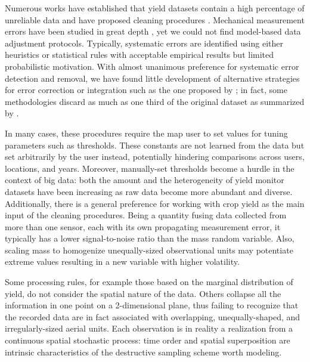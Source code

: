 Numerous works have established that yield datasets contain a high
percentage of unreliable data and have proposed cleaning procedures
\citep{Blackmore1996, Moore1998, Blackmore1999, Thylen2000, Noack2003,
  Simbahan2004, Ping2005, Sudduth2007, Sudduth2012, Spekken2013,
  Leroux2018, Leroux2019, Vega2019}. Mechanical measurement errors
have been studied in great depth \citep{Arslan1999, Arslan2002,
  Grisso2002, Burks2004, Hemming2005, Fulton2009, Schuster2017}, yet
we could not find model-based data adjustment protocols. Typically,
systematic errors are identified using either heuristics or
statistical rules with acceptable empirical results but limited
probabilistic motivation. With almost unanimous preference for
systematic error detection and removal, we have found little
development of alternative strategies for error correction or
integration such as the one proposed by \cite{Bachmaier2007,
  Bachmaier2010}; in fact, some methodologies discard as much as one
third of the original dataset as summarized by \cite{Lyle2013}.

In many cases, these procedures require the map user to set values for
tuning parameters such as thresholds. These constants are not learned
from the data but set arbitrarily by the user instead, potentially
hindering comparisons across users, locations, and years. Moreover,
manually-set thresholds become a hurdle in the context of big data:
both the amount and the heterogeneity of yield monitor datasets have
been increasing as raw data become more abundant and
diverse. Additionally, there is a general preference for working with
crop yield as the main input of the cleaning procedures. Being a
quantity fusing data collected from more than one sensor, each with
its own propagating measurement error, it typically has a lower
signal-to-noise ratio than the mass random variable. Also, scaling
mass to homogenize unequally-sized observational units may potentiate
extreme values resulting in a new variable with higher volatility.

Some processing rules, for example those based on the marginal
distribution of yield, do not consider the spatial nature of the
data. Others collapse all the information in one point on a
2-dimensional plane, thus failing to recognize that the recorded data
are in fact associated with overlapping, unequally-shaped, and
irregularly-sized aerial units. Each observation is in reality a
realization from a continuous spatial stochastic process: time
order and spatial superposition are intrinsic characteristics of the
destructive sampling scheme worth modeling.

